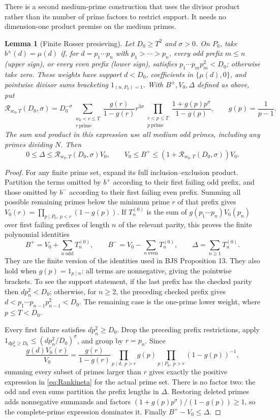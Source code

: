 \documentclass[11pt]{article}
\newtheorem{lemma}[theorem]{Lemma}
\begin{document}
There is a second medium-prime construction that uses the divisor
product rather than its number of prime factors to restrict support.
It needs no dimension-one product premise on the medium primes.
\begin{lemma}[Finite Rosser presieving]\label{lem:rankin}
Let $D_0\ge T^2$ and $\sigma>0$. On $P_0$, take $b^\pm(d)=\mu(d)$
if, for $d=p_1\cdots p_n$ with $p_1>\cdots>p_n$, every odd
prefix $m\le n$ (upper sign), or every even prefix (lower sign),
satisfies $p_1\cdots p_mp_m^2<D_0$; otherwise take zero.
These weights have support $d<D_0$, coefficients in $\{\mu(d),0\}$,
and pointwise divisor sums bracketing $1_{(n,P_0)=1}$.
With $B^\pm,V_0,\Delta$ defined as above, put
\begin{equation}\label{eq:Rankineta}
\mathcal R_{w_0,T}(D_0,\sigma)=D_0^{-\sigma}
\sum_{\substack{w_0<r\le T\\r\ \mathrm{prime}}}
\frac{g(r)}{1-g(r)}r^{3\sigma}
\prod_{\substack{r<p\le T\\p\ \mathrm{prime}}}
\frac{1+g(p)p^\sigma}{1-g(p)},\qquad g(p)=\frac1{p-1}.
\end{equation}
The sum and product in this expression use \emph{all} medium odd primes,
including any primes dividing $N$. Then
\[
0\le\Delta\le\mathcal R_{w_0,T}(D_0,\sigma)V_0,
\qquad V_0\le B^+\le(1+\mathcal R_{w_0,T}(D_0,\sigma))V_0.
\]
\end{lemma}
\begin{proof}
For any finite prime set, expand its full inclusion--exclusion product.
Partition the terms omitted by $b^+$ according to their first failing
odd prefix, and those omitted by $b^-$ according to their first failing
even prefix. Summing all possible remaining primes below the minimum
prime $r$ of that prefix gives $V_0(r)=\prod_{p\mid P_0,\ p<r}(1-g(p))$.
If $T_n^{(0)}$ is the sum of $g(p_1\cdots p_n)V_0(p_n)$ over first
failing prefixes of length $n$ of the relevant parity, this proves the
finite polynomial identities
\[
B^+=V_0+\sum_{n\ \mathrm{odd}}T_n^{(0)},\qquad
B^-=V_0-\sum_{n\ \mathrm{even}}T_n^{(0)},\qquad
\Delta=\sum_{n\ge1}T_n^{(0)}.
\]
They are the finite version of the identities used in BJS Proposition 13.
They also hold when $g(p)=1_{p\mid n}$: all terms are nonnegative,
giving the pointwise brackets. To see the support statement, if the
last prefix has the checked parity then $dp_n^2<D_0$; otherwise, for
$n\ge2$, the preceding checked prefix gives
$d<p_1\cdots p_{n-1}p_{n-1}^2<D_0$. The remaining case is the
one-prime lower weight, where $p\le T<D_0$.

Every first failure satisfies $dp_n^2\ge D_0$. Drop the preceding
prefix restrictions, apply
$1_{dp_n^2\ge D_0}\le(dp_n^2/D_0)^\sigma$, and group by $r=p_n$.
Since
\[
\frac{g(d)V_0(r)}{V_0}
=\frac{g(r)}{1-g(r)}
\prod_{p\mid d,\ p>r}g(p)
\prod_{p\mid P_0,\ p>r}(1-g(p))^{-1},
\]
summing every subset of primes larger than $r$ gives exactly the
positive expression in \eqref{eq:Rankineta} for the actual prime set.
There is no factor two: the odd and even sums partition the prefix
lengths in $\Delta$. Restoring deleted primes adds nonnegative summands
and factors $(1+g(p)p^\sigma)/(1-g(p))\ge1$, so the complete-prime
expression dominates it. Finally $B^+-V_0\le\Delta$.
\end{proof}
\end{document}
